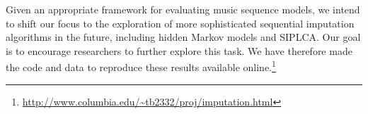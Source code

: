 \documentclass{article}
\begin{document}
Given an appropriate framework for evaluating music sequence models,
we intend to shift our focus to the exploration of more sophisticated
sequential imputation algorithms in the future, including hidden
Markov models and SIPLCA.
%
Our goal is to encourage researchers to further explore this task.  We
have therefore made the code and data to reproduce these results
available
online.\footnote{\scriptsize\url{http://www.columbia.edu/~tb2332/proj/imputation.html}}






\end{document}
